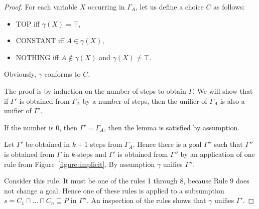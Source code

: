 \documentclass{article}
\newcommand{\barbara}[1]{\todo[inline, color=blue!40]{#1}}
\begin{document}
\begin{proof}
	For each variable $X$ occurring in $\Gamma_A$, let us define a choice $C$ as follows:
	\begin{itemize}
		\item TOP iff $\gamma(X) = \top$,
		\item CONSTANT iff $A \in \gamma(X)$,
		\item NOTHING iff $A \not\in \gamma(X)$ and $\gamma(X) \not= \top$.
	\end{itemize}
	Obviously, %
	$\gamma$ conforms to $C$.
	
	The proof is by induction on the number of steps to obtain $\Gamma$. We will show that if $\Gamma'$ is obtained from $\Gamma_A$ by a number of steps, then the unifier of $\Gamma_A$ is also a unifier of $\Gamma'$.
	
	If the number is $0$, then $\Gamma'=\Gamma_A$, then the lemma is satisfied by assumption.
	
	Let $\Gamma'$ be obtained in $k+1$ steps from $\Gamma_A$. Hence there is a goal $\Gamma''$ such that $\Gamma''$ is obtained from $\Gamma$ in $k$-steps and 
	$\Gamma'$ is obtained from $\Gamma''$ by an application of one rule from Figure~\ref{figure:implicit}.  By assumption $\gamma$ unifies $\Gamma''$.
	
	Consider this rule. It must be one of the rules 1 through 8, because Rule 9 does not change a goal. Hence one of these rules is applied to a subsumption $s = C_1 \sqcap ... \sqcap C_n \sqsubseteq P$ in $\Gamma''$.  An inspection of the rules shows that $\gamma$ unifies $\Gamma'$.
	

\end{proof}
\end{document}
